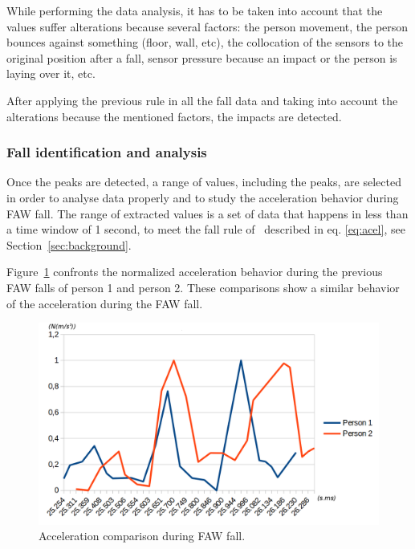 \documentclass[10pt,journal,compsoc]{IEEEtran}
\begin{document}
While performing the data analysis, it has to be taken into account that the values suffer 
alterations because several factors: the person movement, the person bounces against something 
(floor, wall, etc), the collocation of the sensors to the original position after a fall, 
sensor pressure because an impact or the person is laying over it, etc.

After applying the previous rule in all the fall data and taking into account the alterations 
because the mentioned factors, the impacts are detected.

\subsubsection{Fall identification and analysis} Once the peaks are detected, a range of values, 
including the peaks, are selected in order to analyse data properly and to study the acceleration 
behavior during FAW fall. The range of extracted values is a set of data that happens in less 
than a time window of 1 second, to meet the fall rule of~\cite{Luder2009} described in eq. \ref{eq:acel}, see Section~\ref{sec:background}. 

%		

Figure~\ref{fig:FAWcomparison} confronts the normalized acceleration behavior during the previous FAW falls of person 1 and person 2. These comparisons show a similar behavior of the acceleration during the FAW fall.
\begin{figure}[!ht]
	\centering
	\includegraphics[scale=0.22]{Images/TwoFallsComparative.png}
	\caption[Acceleration during FAW fall]{Acceleration comparison during FAW fall.}
	\label{fig:FAWcomparison}
\end{figure}
\end{document}

